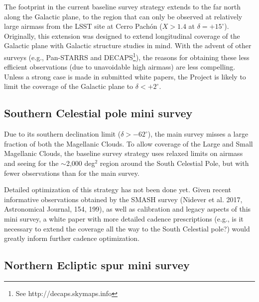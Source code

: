 \documentclass[DM,toc,usenatbib]{lsstdoc}
\begin{document}
The footprint in the current baseline survey strategy extends to the far north along the Galactic
plane, to the region that can only be observed at relatively large airmass from the LSST
site at Cerro Pach\'on ($X>1.4$ at $\delta  = +15^\circ$). Originally, this extension was designed 
to extend longitudinal coverage of the Galactic plane with Galactic structure studies in mind. 
With the advent of other surveys (e.g., Pan-STARRS and DECAPS\footnote{See http://decaps.skymaps.info}), 
the reasons for obtaining these less efficient observations (due to unavoidable high airmass) are less compelling. 
Unless a strong case is made in submitted white papers, the Project is likely to limit the 
coverage of the Galactic plane to $\delta < +2^\circ$. 


\subsection{Southern Celestial pole mini survey}

Due to its southern declination limit ($\delta > -62^\circ$), the main survey misses a large fraction
of both the Magellanic Clouds. To allow coverage of the Large and Small Magellanic Clouds, the 
baseline survey strategy uses relaxed limits on airmass and seeing for the $\sim$2,000 deg$^2$ region 
around the South Celestial Pole, but with fewer observations than for the main survey. 

Detailed optimization of this strategy has not been done yet. Given recent informative observations 
obtained by the SMASH survey (Nidever et al. 2017, Astronomical Journal, 154, 199), as well as calibration 
and legacy aspects of this mini survey, a white paper with more detailed cadence prescriptions
(e.g., is it necessary to extend the coverage all the way to the South Celestial pole?) would greatly 
inform further cadence optimization. 


\subsection{Northern Ecliptic spur mini survey}
\end{document}
